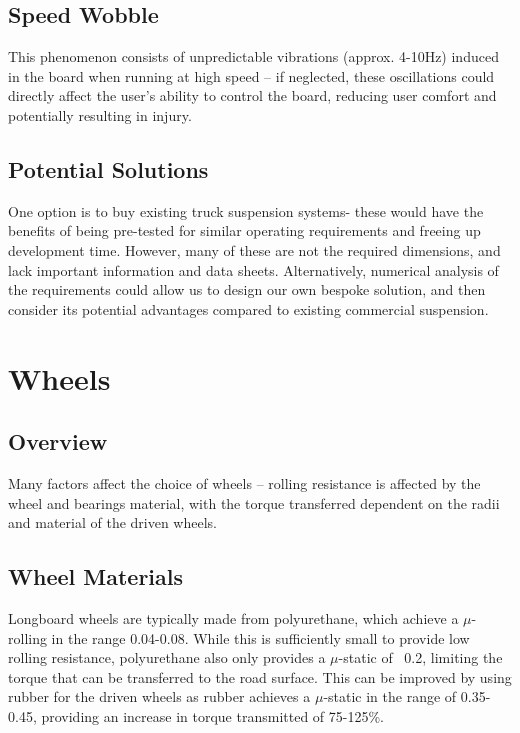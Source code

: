 \documentclass[journal,10pt]{IEEEtran}
\begin{document}
    \subsection{Speed Wobble}
        This phenomenon consists of unpredictable vibrations (approx. 4-10Hz) induced in the board when running at high speed – if neglected, these oscillations could directly affect the user’s ability to control the board, reducing user comfort and potentially resulting in injury. 
    \subsection{Potential Solutions}
        One option is to buy existing truck suspension systems- these would have the benefits of being pre-tested for similar operating requirements and freeing up development time. However, many of these are not the required dimensions, and lack important information and data sheets. Alternatively, numerical analysis of the requirements could allow us to design our own bespoke solution, and then consider its potential advantages compared to existing commercial suspension. 
\section{Wheels}
    \subsection{Overview}
        Many factors affect the choice of wheels – rolling resistance is affected by the wheel and bearings material, with the torque transferred dependent on the radii and material of the driven wheels.
    \subsection{Wheel Materials}
        Longboard wheels are typically made from polyurethane, which achieve a $\mu$-rolling in the range 0.04-0.08. While this is sufficiently small to provide low rolling resistance, polyurethane also only provides a $\mu$-static of ~0.2, limiting the torque that can be transferred to the road surface. This can be improved by using rubber for the driven wheels as rubber achieves a $\mu$-static in the range of 0.35-0.45, providing an increase in torque transmitted of 75-125\%.
\end{document}
